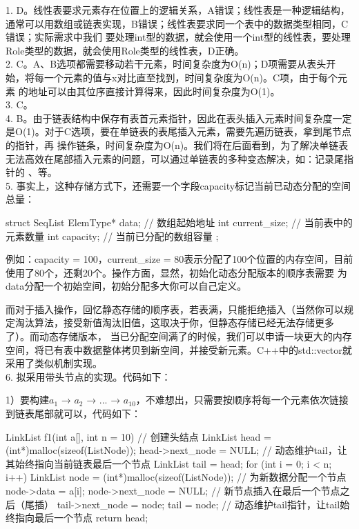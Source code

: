 \begin{exerciseanswer} 
1. D。线性表要求元素存在位置上的逻辑关系，A错误；线性表是一种逻辑结构，通常可以用数组或链表实现，B错误；线性表要求同一个表中的数据类型相同，C错误；实际需求中我们
要处理int型的数据，就会使用一个int型的线性表，要处理Role类型的数据，就会使用Role类型的线性表，D正确。\\

2. C。A、B选项都需要移动若干元素，时间复杂度为O(n)；D项需要从表头开始，将每一个元素的值与x对比直至找到，时间复杂度为O(n)。C项，由于每个元素
的地址可以由其位序直接计算得来，因此时间复杂度为O(1)。\\

3. C。\\

4. B。由于链表结构中保存有表首元素指针，因此在表头插入元素时间复杂度一定是O(1)。对于C选项，要在单链表的表尾插入元素，需要先遍历链表，拿到尾节点的指针，再
操作链条，时间复杂度为O(n)。我们将在后面看到，为了解决单链表无法高效在尾部插入元素的问题，可以通过单链表的多种变态解决，如：记录尾指针的
、等。\\

5. 事实上，这种存储方式下，还需要一个字段capacity标记当前已动态分配的空间总量：
\begin{cppcode}
    struct SeqList {
        ElemType* data;     // 数组起始地址
        int current_size;  // 当前表中的元素数量
        int capacity;      // 当前已分配的数组容量
    };
\end{cppcode}
例如：capacity = 100，current\_size = 80表示分配了100个位置的内存空间，目前使用了80个，还剩20个。操作方面，显然，初始化动态分配版本的顺序表需要
为data分配一个初始空间，初始分配多大你可以自己定义。

而对于插入操作，回忆静态存储的顺序表，若表满，只能拒绝插入（当然你可以规定淘汰算法，接受新值淘汰旧值，这取决于你，但静态存储已经无法存储更多了）。而动态存储版本，
当已分配空间满了的时候，我们可以申请一块更大的内存空间，将已有表中数据整体拷贝到新空间，并接受新元素。C++中的std::vector就采用了类似机制实现。\\

6. 拟采用带头节点的实现。代码如下：

1）要构建\(a_1\) → \(a_2\) → ... → \(a_{10}\)，不难想出，只需要按顺序将每一个元素依次链接到链表尾部就可以，代码如下：
\begin{cppcode}
    LinkList f1(int a[], int n = 10) {
        // 创建头结点
        LinkList head = (int*)malloc(sizeof(ListNode));
        head->next_node = NULL;     
        // 动态维护tail，让其始终指向当前链表最后一个节点
        LinkList tail = head;
        for (int i = 0; i < n; i++) {
            LinkList node = (int*)malloc(sizeof(ListNode));   // 为新数据分配一个节点
            node->data = a[i];
            node->next_node = NULL;
            // 新节点插入在最后一个节点之后（尾插）
            tail->next_node = node;
            tail = node;    // 动态维护tail指针，让tail始终指向最后一个节点
        }
        return head;
    }
\end{cppcode}


\end{exerciseanswer}
